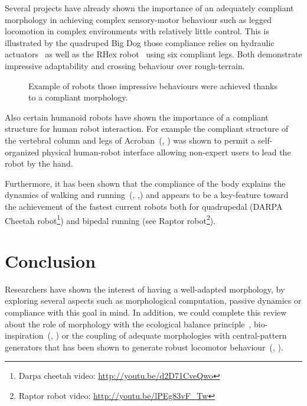 Several projects have already shown the importance of an adequately compliant morphology in achieving complex sensory-motor behaviour such as legged locomotion in complex environments with relatively little control.  This is illustrated by the quadruped Big Dog those compliance relies on hydraulic actuators~\parencite{raibert2008bigdog} as well as the RHex robot~\parencite{saranli2001rhex} using six compliant legs. Both demonstrate impressive adaptability and crossing behaviour over rough-terrain.

\begin{figure}[tb]
\centering
    \hfil
    \caption{Example of robots those impressive behaviours were achieved thanks to a compliant morphology.}
    \label{fig:compliant_robot}
\end{figure}

Also certain humanoid robots have shown the importance of a compliant structure for human robot interaction. For example the compliant structure of the vertebral column and legs of Acroban~(\cite{ly2011bio}, \cite{Oudeyer2011}) was shown to permit a self-organized physical human-robot interface allowing non-expert users to lead the robot by the hand.

Furthermore, it has been shown that the compliance of the body explains the dynamics of walking and running~(\cite{Geyer2006}, \cite{iida2007bipedal},) and appears to be a key-feature toward the achievement of the fastest current robots both for quadrupedal (DARPA Cheetah robot\footnote{Darpa cheetah video: \url{http://youtu.be/d2D71CveQwo}}) and bipedal running (see Raptor robot\footnote{Raptor robot video: \url{http://youtu.be/lPEg83vF_Tw}}).



\section{Conclusion} %

Researchers have shown the interest of having a well-adapted morphology, by exploring several aspects such as morphological computation, passive dynamics or compliance with this goal in mind. In addition, we could complete this review about the role of morphology with the ecological balance principle~\parencite{pfeifer2005new}, bio-inspiration~(\cite{scarfogliero2009use}, \cite{Pfeifer07}) or the coupling of adequate morphologies with central-pattern generators that has been shown to generate robust locomotor behaviour~(\cite{ijspeert2007swimming}, \cite{steingrube2010self}).

